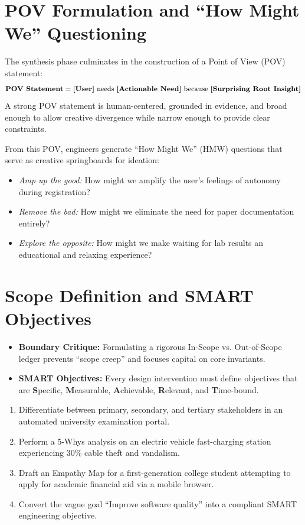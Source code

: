 \section{POV Formulation and ``How Might We'' Questioning}
The synthesis phase culminates in the construction of a Point of View (POV) statement:
\[
\text{\textbf{POV Statement}} = \textbf{[User]} \text{ needs } \textbf{[Actionable Need]} \text{ because } \textbf{[Surprising Root Insight]}
\]
A strong POV statement is human-centered, grounded in evidence, and broad enough to allow creative divergence while narrow enough to provide clear constraints.

From this POV, engineers generate ``How Might We'' (HMW) questions that serve as creative springboards for ideation:
\begin{itemize}
    \item \textit{Amp up the good:} How might we amplify the user's feelings of autonomy during registration?
    \item \textit{Remove the bad:} How might we eliminate the need for paper documentation entirely?
    \item \textit{Explore the opposite:} How might we make waiting for lab results an educational and relaxing experience?
\end{itemize}

\section{Scope Definition and SMART Objectives}
\begin{itemize}
    \item \textbf{Boundary Critique:} Formulating a rigorous In-Scope vs. Out-of-Scope ledger prevents ``scope creep'' and focuses capital on core invariants.
    \item \textbf{SMART Objectives:} Every design intervention must define objectives that are \textbf{S}pecific, \textbf{M}easurable, \textbf{A}chievable, \textbf{R}elevant, and \textbf{T}ime-bound.
\end{itemize}

\begin{practiceset}
\begin{enumerate}[leftmargin=1.5em]
    \item Differentiate between primary, secondary, and tertiary stakeholders in an automated university examination portal.
    \item Perform a 5-Whys analysis on an electric vehicle fast-charging station experiencing 30\% cable theft and vandalism.
    \item Draft an Empathy Map for a first-generation college student attempting to apply for academic financial aid via a mobile browser.
    \item Convert the vague goal ``Improve software quality'' into a compliant SMART engineering objective.
\end{enumerate}
\end{practiceset}
